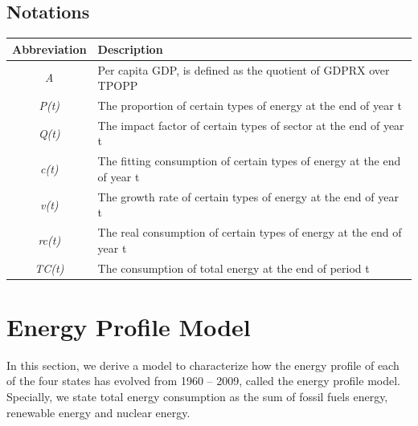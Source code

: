\documentclass{mcmthesis}
\begin{document}
\subsection{Notations}
\begin{table}[h]
	\centering
	\label{my-label}
	\begin{tabular}{@{}cl@{}}
		\toprule
		\multicolumn{1}{l}{Abbreviation} & Description                                                             \\ \midrule
		\textit{A}                       & Per capita GDP, is defined as the quotient of GDPRX over TPOPP          \\
		\textit{P(t)}                    & The proportion of certain types of energy at the end of year t          \\
		\textit{Q(t)}                    & The impact factor of certain types of sector at the end of year t       \\
		\textit{c(t)}                    & The fitting consumption of certain types of energy at the end of year t \\
		\textit{v(t)}                    & The growth rate of certain types of energy at the end of year t         \\
		\textit{rc(t)}                   & The real consumption of certain types of energy at the end of year t    \\
		\textit{TC(t)}                   & The consumption of total energy at the end of period t                  \\ \bottomrule
	\end{tabular}
\end{table}
\section{Energy Profile Model}
In this section, we derive a model to characterize how the energy profile of each of the four states has evolved from 1960 – 2009, called the energy profile model. Specially, we state total energy consumption as the sum of fossil fuels energy, renewable energy and nuclear energy.
\end{document}
